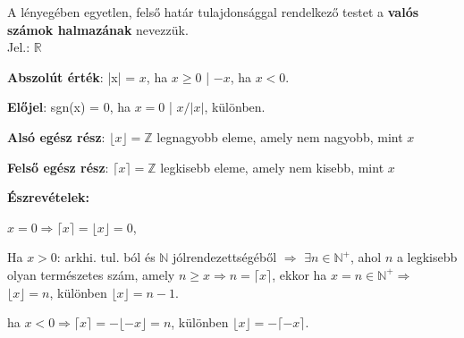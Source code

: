 \begin{frame}
\begin{tcolorbox}[title={Def.: Valós számok halmaza}]
  A lényegében egyetlen, felső határ tulajdonsággal rendelkező testet a \textbf{valós számok halmazának} nevezzük.\\
  Jel.: $\mathbb{R}$
\end{tcolorbox}

\begin{tcolorbox}[title={Def.: néhány Függvény (?)}]
  \textbf{Abszolút érték}: |x| = $x$, ha $x \geq 0$ | $-x$, ha $x < 0$.\\
  \msmallskip
  
  \textbf{Előjel}: sgn(x) = $0$, ha $x = 0$ | $x / |x|$, különben.\\
  \msmallskip
  
  \textbf{Alsó egész rész}: ${\lfloor}x{\rfloor} = \mathbb{Z}$ legnagyobb eleme, amely nem nagyobb, mint $x$\\
  \msmallskip
  
  \textbf{Felső egész rész}: ${\lceil}x{\rceil} = \mathbb{Z}$ legkisebb eleme, amely nem kisebb, mint $x$\\
  \mbigskip

  \textbf{Észrevételek:}\\
  \msmallskip

  $x = 0 \Rightarrow {\lceil}x{\rceil} = {\lfloor}x{\rfloor} = 0$,\\
  \msmallskip
  
  Ha $x > 0$: arkhi. tul. ból és $\mathbb{N}$ jólrendezettségéből $\Rightarrow$ ${\exists}n \in \mathbb{N}^+$, ahol $n$ a legkisebb olyan természetes szám, amely $n \geq x \Rightarrow n = {\lceil}x{\rceil}$, ekkor ha $x = n \in \mathbb{N}^+ \Rightarrow$ ${\lfloor}x{\rfloor} = n$, különben ${\lfloor}x{\rfloor} = n - 1$.\\
  \mmedskip

  ha $x < 0 \Rightarrow {\lceil}x{\rceil} = -{\lfloor}-x{\rfloor} = n$, különben ${\lfloor}x{\rfloor} = -{\lceil}-x{\rceil}$.
\end{tcolorbox}
\end{frame}


